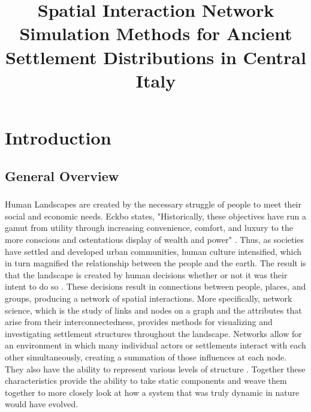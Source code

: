 \documentclass[12pt,a4paper]{thesis}
\begin{document}
\title{Spatial Interaction Network Simulation Methods for Ancient Settlement Distributions in Central Italy}

\maketitle

\tableofcontents

\chapter{Introduction}
\section{General Overview}

\paragraph{}
Human Landscapes are created by the necessary struggle of people to meet their social and economic needs.  Eckbo states, "Historically, these objectives have run a gamut from utility through increasing convenience, comfort, and luxury to the more conscious and ostentatious display of wealth and power" \citeyearpar[p. 8]{Eckbo69}. Thus, as societies have settled and developed urban communities, human culture intensified, which in turn magnified the relationship between the people and the earth. The result is that the landscape is created by human decisions whether or not it was their intent to do so \citetext{\citealp[3-8]{Eckbo69}; \citealp[161]{AnsWilSch01}}. These decisions result in connections between people, places, and groups, producing a network of spatial interactions. More specifically, network science, which is the study of links and nodes on a graph and the attributes that arise from their interconnectedness, provides methods for visualizing and investigating settlement structures throughout the landscape. Networks allow for an environment in which many individual actors or settlements interact with each other simultaneously, creating a summation of those influences at each node. They also have the ability to represent various levels of structure \cite[9-10]{KnoKuk92}. Together these characteristics provide the ability to take static components and weave them together to more closely look at how a system that was truly dynamic in nature would have evolved.
\end{document}
